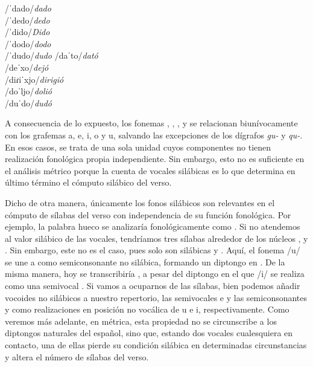 \begin{exe}  
\ex\label{ex:dado} /ˈdado/\tab\textit{dado} \\
 /ˈdedo/\tab\textit{dedo}\\ 
 /ˈdido/\tab\textit{Dido}\\
  /ˈdodo/\tab\textit{dodo}\\
  /ˈdudo/\tab\textit{dudo} 
\ex\label{ex:dato}  /daˈto/\tab\textit{dató} \\
/deˈxo/\tab\textit{dejó}\\ 
/diɾiˈxjo/\tab\textit{dirigió} \\
 /doˈljo/\tab\textit{dolió} \\
  /duˈdo/\tab\textit{dudó}
\end{exe}

A consecuencia de lo expuesto, los fonemas , , ,  y  se relacionan biunívocamente con los grafemas  \textlangle{}a\textrangle{}, \textlangle{}e\textrangle{}, \textlangle{}i\textrangle{}, \textlangle{}o\textrangle{} y \textlangle{}u\textrangle{}, salvando las excepciones de los dígrafos \textit{gu-} y \textit{qu-}. En esos casos, se trata de una sola unidad cuyos componentes no tienen realización fonológica propia independiente. Sin embargo, esto no es suficiente en el análisis métrico porque la cuenta de vocales silábicas es lo que determina en último término el cómputo silábico del verso.

Dicho de otra manera, únicamente los fonos silábicos son relevantes en el cómputo de sílabas del verso con independencia de su función fonológica. Por ejemplo, la palabra \textlangle{}hueco\textrangle{} se analizaría fonológicamente como . Si no atendemos al valor silábico de las vocales, tendríamos tres sílabas alrededor de los núcleos ,  y . Sin embargo, este no es el caso, pues solo son silábicas  y . Aquí, el fonema /u/ se une a  como semiconsonante no silábica, formando un diptongo en \ipa{[ˈwe.ko]}. De la misma manera, \textlangle{}hoy\textrangle{} se transcribiría , a pesar del diptongo en el que /i/ se realiza como una semivocal \ipa{[oi̯]}. Si vamos a ocuparnos de las sílabas, bien podemos añadir vocoides no silábicos a nuestro repertorio,  las semivocales \ipa{[u̯]} e \ipa{[i̯]} y las semiconsonantes \ipa{[w]} y \ipa{[j]} como realizaciones en posición no vocálica de \textlangle{}u\textrangle{} e \textlangle{}i\textrangle{}, respectivamente. Como veremos más adelante, en métrica, esta propiedad no se circunscribe a los diptongos naturales del español, sino que, estando dos vocales cualesquiera en contacto, una de ellas pierde su condición silábica en determinadas circunstancias y altera el número de sílabas del verso.

